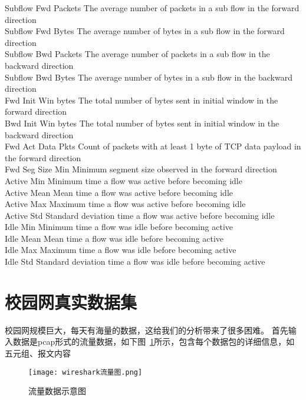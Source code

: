 Subflow Fwd Packets		The average number of packets in a sub flow in the forward direction \\
Subflow Fwd Bytes		The average number of bytes in a sub flow in the forward direction \\
Subflow Bwd Packets		The average number of packets in a sub flow in the backward direction \\
Subflow Bwd Bytes		The average number of bytes in a sub flow in the backward direction \\
Fwd Init Win bytes		The total number of bytes sent in initial window in the forward direction \\
Bwd Init Win bytes		The total number of bytes sent in initial window in the backward direction \\
Fwd Act Data Pkts		Count of packets with at least 1 byte of TCP data payload in the forward direction \\
Fwd Seg Size Min		Minimum segment size observed in the forward direction \\
Active Min			Minimum time a flow was active before becoming idle \\
Active Mean			Mean time a flow was active before becoming idle \\
Active Max			Maximum time a flow was active before becoming idle \\
Active Std			Standard deviation time a flow was active before becoming idle \\
Idle Min			Minimum time a flow was idle before becoming active \\
Idle Mean			Mean time a flow was idle before becoming active \\
Idle Max			Maximum time a flow was idle before becoming active \\
Idle Std			Standard deviation time a flow was idle before becoming active \\

\section{校园网真实数据集}

校园网规模巨大，每天有海量的数据，这给我们的分析带来了很多困难。
首先输入数据是pcap形式的流量数据，如下图~\ref{fig:wireshark}所示，包含每个数据包的详细信息，如五元组、报文内容

\begin{figure}
    \centering
    \texttt{[image: wireshark流量图.png]}
    \caption{流量数据示意图}
    \label{fig:wireshark}
  \end{figure}

